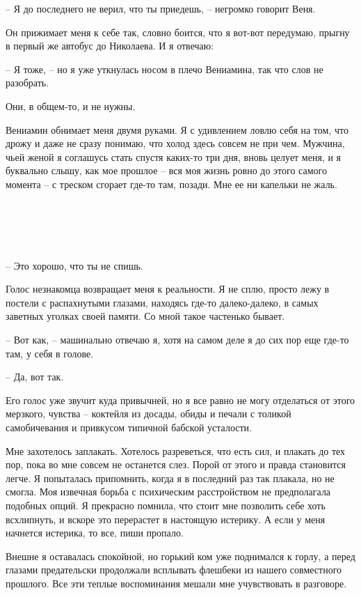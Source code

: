 \documentclass[
]{book}
\begin{document}
-- Я до последнего не верил, что ты приедешь, -- негромко говорит Веня.

Он прижимает меня к себе так, словно боится, что я вот-вот передумаю, прыгну в первый же автобус до Николаева. И я отвечаю:

-- Я тоже, -- но я уже уткнулась носом в плечо Вениамина, так что слов не разобрать.

Они, в общем-то, и не нужны.

Вениамин обнимает меня двумя руками. Я с удивлением ловлю себя на том, что дрожу и даже не сразу понимаю, что холод здесь совсем не при чем. Мужчина, чьей женой я соглашусь стать спустя каких-то три дня, вновь целует меня, и я буквально слышу, как мое прошлое -- вся моя жизнь ровно до этого самого момента -- с треском сгорает где-то там, позади.
Мне ее ни капельки не жаль.

\hypertarget{chapter-53}{%
\chapter{~}\label{chapter-53}}

-- Это хорошо, что ты не спишь.

Голос незнакомца возвращает меня к реальности. Я не сплю, просто лежу в постели с распахнутыми глазами, находясь где-то далеко-далеко, в самых заветных уголках своей памяти. Со мной такое частенько бывает.

-- Вот как, -- машинально отвечаю я, хотя на самом деле я до сих пор еще где-то там, у себя в голове.

-- Да, вот так.

Его голос уже звучит куда привычней, но я все равно не могу отделаться от этого мерзкого, чувства -- коктейля из досады, обиды и печали с толикой самобичевания и привкусом типичной бабской усталости.

Мне захотелось заплакать. Хотелось разреветься, что есть сил, и плакать до тех пор, пока во мне совсем не останется слез. Порой от этого и правда становится легче. Я попыталась припомнить, когда я в последний раз так плакала, но не смогла. Моя извечная борьба с психическим расстройством не предполагала подобных опций. Я прекрасно помнила, что стоит мне позволить себе хоть всхлипнуть, и вскоре это перерастет в настоящую истерику. А если у меня начнется истерика, то все, пиши пропало.

Внешне я оставалась спокойной, но горький ком уже поднимался к горлу, а перед глазами предательски продолжали всплывать флешбеки из нашего совместного прошлого. Все эти теплые воспоминания мешали мне учувствовать в разговоре.
\end{document}

